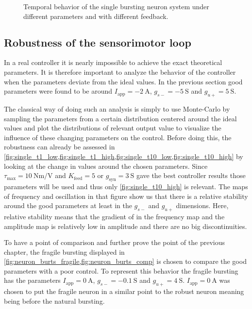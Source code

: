 \begin{figure}[!htbp]
    \centering
    \caption{Temporal behavior of the single bursting neuron system under different parameters and with different feedback.}
    \label{fig:single_control_traces}
\end{figure}

\subsection{Robustness of the sensorimotor loop}

In a real controller it is nearly impossible to achieve the exact theoretical parameters. 
It is therefore important to analyze the behavior of the controller when the parameters deviate from the ideal values. 
In the previous section good parameters were found to be around $I_\text{app} = \qty{-2}{\ampere}$, $g_{s-} = \qty{-5}{\siemens}$ and $g_{u+} = \qty{5}{\siemens}$. 

The classical way of doing such an analysis is simply to use Monte-Carlo by sampling the parameters from a certain distribution centered around the ideal values and plot the distributions of relevant output value to visualize the influence of these changing parameters on the control. 
Before doing this, the robustness can already be assessed in \cref{fig:single_t1_low,fig:single_t1_high,fig:single_t10_low,fig:single_t10_high} by looking at the change in values around the chosen parameters. 
Since $\tau_\text{max}=\qty{10}{\newton\meter\per\volt}$ and $K_\text{feed} = 5$ or $g_{\text{syn}} = \qty{3}{\siemens}$ gave the best controller results those parameters will be used and thus only \cref{fig:single_t10_high} is relevant. 
The maps of frequency and oscillation in that figure show us that there is a relative stability around the good parameters at least in the $g_{s-}$ and $g_{u+}$ dimensions. 
Here, relative stability means that the gradient of in the frequency map and the amplitude map is relatively low in amplitude and there are no big discontinuities.

To have a point of comparison and further prove the point of the previous chapter, the fragile bursting displayed in \cref{fig:neuron_burts_fragile,fig:neuron_burts_comp} is chosen to compare the good parameters with a poor control. 
To represent this behavior the fragile bursting has the parameters $I_\text{app} = \qty{0}{\ampere}$, $g_{s-} = \qty{-0.1}{\siemens}$ and $g_{u+} = \qty{4}{\siemens}$. $I_\text{app} = \qty{0}{\ampere}$ was chosen to put the fragile neuron in a similar point to the robust neuron meaning being before the natural bursting.

